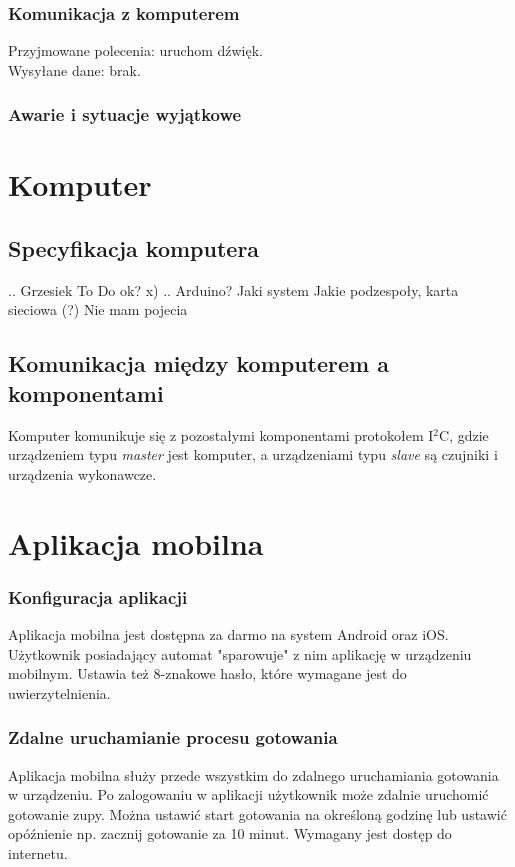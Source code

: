 \documentclass[12pt,a4paper,notitlepage]{report}
\begin{document}
\subsubsection{Komunikacja z komputerem}
Przyjmowane polecenia: uruchom dźwięk.\\
Wysyłane dane: brak.


\subsubsection{Awarie i sytuacje wyjątkowe}


\section{Komputer}

\subsection{Specyfikacja komputera}
.. Grzesiek To Do ok? x) ..
Arduino?
Jaki system
Jakie podzespoły, karta sieciowa (?)
Nie mam pojecia

\subsection{Komunikacja między komputerem a komponentami}
Komputer komunikuje się z pozostałymi komponentami protokołem I$^2$C, gdzie urządzeniem typu \emph{master} jest komputer, a urządzeniami typu \emph{slave} są czujniki i urządzenia wykonawcze.

\section{Aplikacja mobilna}
\subsubsection{Konfiguracja aplikacji}
Aplikacja mobilna jest dostępna za darmo na system Android oraz iOS. Użytkownik posiadający automat "sparowuje" z nim aplikację w urządzeniu mobilnym. Ustawia też 8-znakowe hasło, które wymagane jest do uwierzytelnienia.
\subsubsection{Zdalne uruchamianie procesu gotowania}
Aplikacja mobilna służy przede wszystkim do zdalnego uruchamiania gotowania w urządzeniu. Po zalogowaniu w aplikacji użytkownik może zdalnie uruchomić gotowanie zupy. Można ustawić start gotowania na określoną godzinę lub ustawić opóźnienie np. zacznij gotowanie za 10 minut. Wymagany jest dostęp do internetu.
\end{document}
